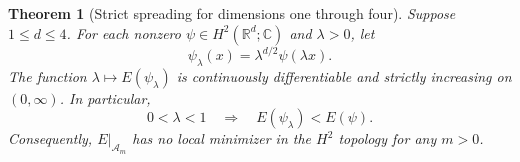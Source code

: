 \documentclass[11pt]{article}
\newtheorem{theorem}{Theorem}
\newcommand{\R}{\mathbb{R}}
\newcommand{\C}{\mathbb{C}}
\newcommand{\A}{\mathcal{A}}
\begin{document}
\begin{theorem}[Strict spreading for dimensions one through four]\label{thm:monotone}
Suppose $1\le d\le4$. For each nonzero
$\psi\in H^2(\R^d;\C)$ and $\lambda>0$, let
\begin{equation}\label{eq:dilation}
 \psi_\lambda(x)=\lambda^{d/2}\psi(\lambda x).
\end{equation}
The function $\lambda\mapsto E(\psi_\lambda)$ is continuously
differentiable and strictly increasing on $(0,\infty)$. In particular,
\begin{equation}\label{eq:strict}
 0<\lambda<1\quad\Longrightarrow\quad E(\psi_\lambda)<E(\psi).
\end{equation}
Consequently, $E|_{\A_m}$ has no local minimizer in the $H^2$
topology for any $m>0$.
\end{theorem}
\end{document}
